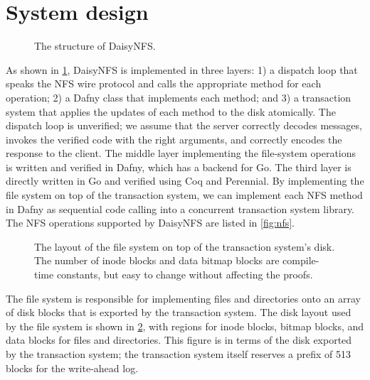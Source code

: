 \section{System design}%
\label{sec:daisy:system}

\begin{figure}
  \center
  
  \caption{The structure of DaisyNFS.}
  \label{fig:system}
\end{figure}

As shown in \cref{fig:system}, DaisyNFS is implemented in three layers:
1) a dispatch loop that speaks the NFS wire protocol and calls the
appropriate method for each operation; 2) a Dafny class that
implements each method; and 3) a transaction system that applies the
updates of each method to the disk atomically.  The dispatch loop is
unverified; we assume that the server correctly decodes messages, invokes the
verified code with the right arguments, and correctly encodes the response to
the client. The
middle layer implementing the file-system operations is written
and verified in Dafny, which has a backend for Go.  The
third layer is directly written in Go and verified using Coq and
Perennial.  By implementing the file system on top of the transaction
system, we can implement each NFS method in Dafny as sequential code
calling into a concurrent transaction system library. The NFS
operations supported by DaisyNFS are listed in \cref{fig:nfs}.


\begin{figure}
  \centering
  
  \caption[File-system disk layout]%
  {The layout of the file system on top of the transaction system's
    disk. The number of inode blocks and data bitmap blocks are compile-time
    constants, but easy to change without affecting the proofs.}
  \label{fig:layout}
\end{figure}

The file system is responsible for implementing files and directories
onto an array of disk blocks that is exported by the transaction
system.  The disk layout used by the file system is shown in
\cref{fig:layout}, with regions for inode blocks, bitmap blocks,
and data blocks for files and directories. This figure is in terms of
the disk exported by the transaction system; the transaction system
itself reserves a prefix of 513 blocks for the write-ahead log.

